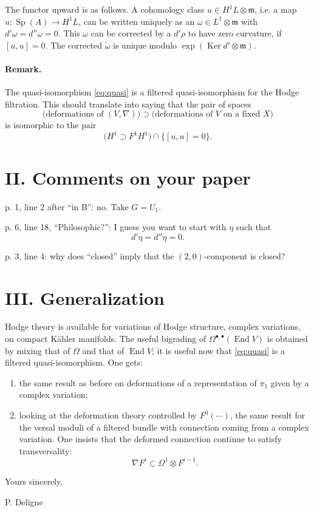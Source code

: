 \documentclass[11pt]{article}
\newcommand{\End}{\operatorname{End}}
\newcommand{\Sp}{\operatorname{Sp}}
\newcommand{\Ker}{\operatorname{Ker}}
\begin{document}
The functor upward is as follows. A cohomology class $u\in H^1L\otimes\mathfrak m$, i.e. a map $u:\Sp(A)\to H^1L$, can be written uniquely as an $\omega\in L^1\otimes\mathfrak m$ with $d'\omega=d''\omega=0$. This $\omega$ can be corrected by a $d'\rho$ to have zero curvature, if $[u,u]=0$. The corrected $\widetilde\omega$ is unique modulo $\exp(\Ker d'\otimes\mathfrak m)$.

\paragraph{Remark.}
The quasi-isomorphism \eqref{eq:quasi} is a filtered quasi-isomorphism for the Hodge filtration. This should translate into saying that the pair of spaces
\[
  \bigl(\text{deformations of }(V,\nabla)\bigr)
  \supset
  \bigl(\text{deformations of }V\text{ on a fixed }X\bigr)
\]
is isomorphic to the pair
\[
  \bigl(H^1\supset F^1H^1\bigr)\cap\{[u,u]=0\}.
\]

\section*{II. Comments on your paper}

p. 1, line 2 after ``in B'': no. Take $G=U_1$.

p. 6, line 18, ``Philosophic?'': I guess you want to start with $\eta$ such that
\[
  d'\eta=d''\eta=0.
\]

p. 3, line 4: why does ``closed'' imply that the $(2,0)$-component is closed?

\section*{III. Generalization}

Hodge theory is available for variations of Hodge structure, complex variations, on compact Kähler manifolds. The useful bigrading of $\Omega^{\bullet,\bullet}(\End V)$ is obtained by mixing that of $\Omega$ and that of $\End V$; it is useful now that \eqref{eq:quasi} is a filtered quasi-isomorphism. One gets:

\begin{enumerate}[label=\alph*)]
\item the same result as before on deformations of a representation of $\pi_1$ given by a complex variation;
\item looking at the deformation theory controlled by $F^0(\cdots)$, the same result for the versal moduli of a filtered bundle with connection coming from a complex variation. One insists that the deformed connection continue to satisfy transversality:
\[
  \nabla F^i\subset \Omega^1\otimes F^{i-1}.
\]
\end{enumerate}

Yours sincerely,

\begin{flushright}
P. Deligne
\end{flushright}
\end{document}
